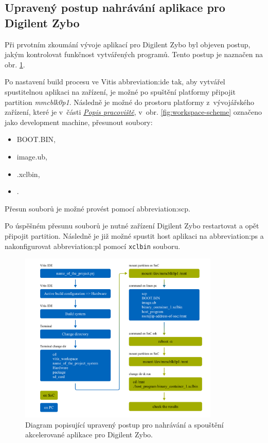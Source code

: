 \documentclass[a4paper, twoside, 11pt]{article}
\begin{document}
\begin{appendices}
	\section{Upravený postup nahrávání aplikace pro Digilent Zybo}
	Při prvotním zkoumání vývoje aplikací pro Digilent Zybo byl objeven postup, jakým kontrolovat funkčnost vytvářených programů. Tento postup je naznačen na obr. \ref{fig:vitis-edited-debugging-flow}.\par
	Po nastavení build procesu ve Vitis \gls{abbreviation:ide} tak, aby vytvářel spustitelnou aplikaci na zařízení, je možné po spuštění platformy připojit partition \textit{mmcblk0p1}. Následně je možné do prostoru platformy z~vývojářského zařízení, které je v~části \hyperref[sec:popis-pracoviste]{\textit{Popis pracoviště}}, v~obr. \ref{fig:workspace-scheme} označeno jako \textcolor{ctuorange}{development machine}, přesunout soubory:
	\begin{itemize}
		\item BOOT.BIN,
		\item image.ub,
		\item <binary-container-name>.xclbin,
		\item <host-program-name>.
	\end{itemize}\par
	Přesun souborů je možné provést pomocí \gls{abbreviation:scp}.\par
	Po úspěšném přesunu souborů je nutné zařízení Digilent Zybo restartovat a opět připojit partition. Následně je již možné spustit host aplikaci na \gls{abbreviation:ps} a nakonfigurovat \gls{abbreviation:pl} pomocí \texttt{xclbin} souboru.
	\begin{figure}[htbp!]
		\centering
		\includegraphics[width=0.85\textwidth]{src/pdf/vitis-edited-debugging-flow.pdf}
		\caption{Diagram popisující upravený postup pro nahrávání a spouštění akcelerované aplikace pro Digilent Zybo.}
		\label{fig:vitis-edited-debugging-flow}
	\end{figure}


\end{appendices}
\end{document}
